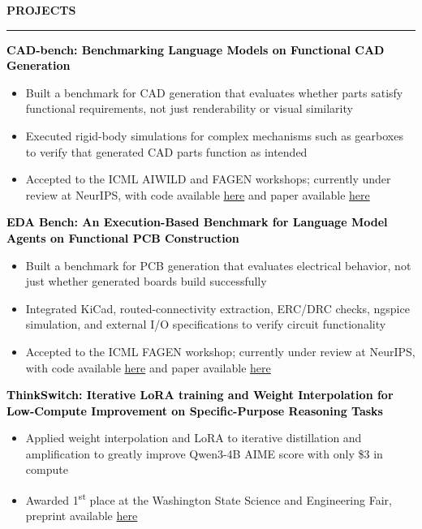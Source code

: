\documentclass[8pt,a4paper]{altacv}
\newcommand{\resumebodysize}{\fontsize{8pt}{9pt}\selectfont}
\renewcommand{\divider}{\textcolor{body!30}{\hdashrule{\linewidth}{0.6pt}{0.285em}}\vspace{4.096pt}}
\newcommand{\projectdivider}{\vskip-1.937pt\divider}
\renewcommand{\cvsection}[2][]{%
  \bigskip%
  \vspace{3.686pt}%
  \ifstrequal{#1}{}{}{\marginpar{\vspace*{\dimexpr1pt-\baselineskip}\raggedright}}%
  {\color{heading}\large\bfseries\MakeUppercase{#2}}\\[-1ex]\vspace{1.489pt}%
  {\color{heading}\rule{\linewidth}{2pt}\par}\medskip\vspace{1.179pt}
}
\renewcommand{\cvevent}[4]{%
  {\fontsize{9pt}{9pt}\selectfont\color{black}\hspace*{-0.282pt}#1\par}
  \ifstrequal{#2}{}{}{%
    \vspace{2.144pt}
    {\fontsize{9pt}{9pt}\selectfont\textbf{\color{accent}#2}\hspace{0.5em}\resumebodysize\faCalendar\hspace{0.5em}#3\par}%
  }%
  \vspace{2.145pt}\resumebodysize
}
\begin{document}
\vskip-4.265pt
\cvsection{Projects}
\vskip-1.479pt

\cvevent{\textcolor{black}{\textbf{CAD-bench: Benchmarking Language Models on Functional CAD Generation}}}{}{}{}
\begin{itemize}
\item Built a benchmark for CAD generation that evaluates whether parts satisfy functional requirements, not just renderability or visual similarity
\item Executed rigid-body simulations for complex mechanisms such as gearboxes to verify that generated CAD parts function as intended
\item Accepted to the ICML AIWILD and FAGEN workshops; currently under review at NeurIPS, with code available \href{https://github.com/cad-bench/cad-bench}{here} and paper available \href{https://github.com/CAD-bench/cad-bench/blob/main/paper/main.pdf}{here}
\end{itemize}
\projectdivider

\cvevent{\textcolor{black}{\textbf{EDA Bench: An Execution-Based Benchmark for Language Model Agents on Functional PCB Construction}}}{}{}{}
\begin{itemize}
\item Built a benchmark for PCB generation that evaluates electrical behavior, not just whether generated boards build successfully
\item Integrated KiCad, routed-connectivity extraction, ERC/DRC checks, ngspice simulation, and external I/O specifications to verify circuit functionality
\item Accepted to the ICML FAGEN workshop; currently under review at NeurIPS, with code available \href{https://github.com/eda-bench/eda-bench}{here} and paper available \href{https://github.com/eda-bench/eda-bench/blob/master/paper/main.pdf}{here}
\end{itemize}
\projectdivider

\cvevent{\textcolor{black}{\textbf{ThinkSwitch: Iterative LoRA training and Weight Interpolation for Low-Compute Improvement on Specific-Purpose Reasoning Tasks}}}{}{}{}
\begin{itemize}
\item Applied weight interpolation and LoRA to iterative distillation and amplification to greatly improve Qwen3-4B AIME score with only \$3 in compute
\item Awarded 1\textsuperscript{st} place at the Washington State Science and Engineering Fair, preprint available \href{https://arxiv.org/abs/2606.01080}{here}
\end{itemize}
\divider
\end{document}
